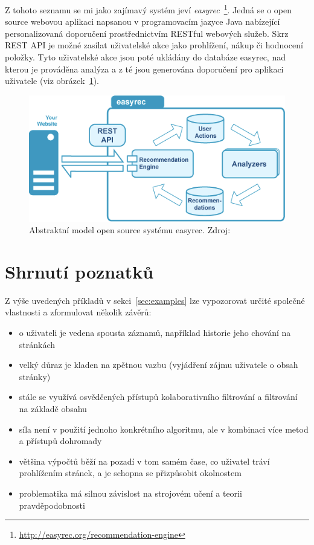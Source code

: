 \documentclass[thesis=M,czech]{FITthesis}[2014/05/07]
\begin{document}
Z tohoto seznamu se mi jako zajímavý systém jeví \emph{easyrec}~\footnote{\url{http://easyrec.org/recommendation-engine}}. Jedná se o open source webovou aplikaci napsanou v programovacím jazyce Java nabízející personalizovaná doporučení prostřednictvím RESTful webových služeb. Skrz REST API je možné zasílat uživatelské akce jako prohlížení, nákup či hodnocení položky. Tyto uživatelské akce jsou poté ukládány do databáze easyrec, nad kterou je prováděna analýza a z té jsou generována doporučení pro aplikaci uživatele (viz obrázek~\ref{fig:easyrec}).

\begin{figure}\centering
	\includegraphics[width=1.0\textwidth]{obr/easyrec.png}
 	\caption[Abstraktní model open source systému easyrec]{Abstraktní model open source systému easyrec. Zdroj: \cite{easyrec}}\label{fig:easyrec}
\end{figure}	

\section{Shrnutí poznatků}

Z výše uvedených příkladů v sekci~\ref{sec:examples} lze vypozorovat určité společné vlastnosti a zformulovat několik závěrů:

\begin{itemize}
	\item o uživateli je vedena spousta záznamů, například historie jeho chování na stránkách
	\item velký důraz je kladen na zpětnou vazbu (vyjádření zájmu uživatele o obsah stránky)
	\item stále se využívá osvědčených přístupů kolaborativního filtrování a filtrování na základě obsahu
	\item síla není v použití jednoho konkrétního algoritmu, ale v kombinaci více metod a přístupů dohromady
	\item většina výpočtů běží na pozadí v tom samém čase, co uživatel tráví prohlížením stránek, a je schopna se přizpůsobit okolnostem
	\item problematika má silnou závislost na strojovém učení a teorii pravděpodobnosti
\end{itemize}
\end{document}
